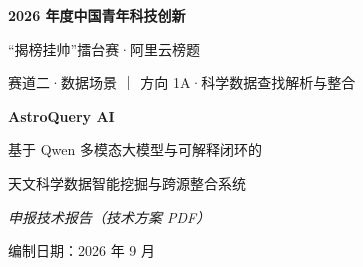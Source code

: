 \documentclass[11pt,a4paper]{ctexart}
\begin{document}
\begin{titlepage}
\centering
\vspace*{2.4cm}
{\LARGE\bfseries 2026 年度中国青年科技创新\par“揭榜挂帅”擂台赛·阿里云榜题\par}
\vspace{1.2cm}
{\large 赛道二·数据场景 ｜ 方向 1A·科学数据查找解析与整合\par}
\vspace{1.6cm}
{\Huge\bfseries AstroQuery AI\par}
\vspace{0.5cm}
{\Large 基于 Qwen 多模态大模型与可解释闭环的\par 天文科学数据智能挖掘与跨源整合系统\par}
\vspace{1.2cm}
{\large\itshape 申报技术报告（技术方案 PDF）\par}
\vfill
{\large 编制日期：2026 年 9 月\par}
\end{titlepage}
\thispagestyle{plain}
\tableofcontents
\clearpage
{}
\setcounter{page}{1}





\end{document}
